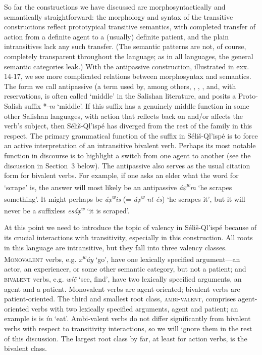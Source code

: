 \documentclass[output=paper,colorlinks,citecolor=brown]{langscibook}
\begin{document}
So far the constructions we have discussed are morphosyntactically and
semantically straightforward: the morphology and syntax of the
transitive constructions reflect prototypical transitive semantics,
with completed transfer of action from a definite agent to a (usually)
definite patient, and the plain intransitives lack any such transfer.
(The semantic patterns are not, of course, completely transparent
throughout the language; as in all languages, the general semantic
categories leak.)  With the antipassive construction, illustrated in
exx. 14-17, we see more complicated relations between morphosyntax and
semantics.  The form we call antipassive (a term used by, among
others, \cite[31]{Kroeber:1999}, \cite{Darnell:1990}, \cite{Gerdts:1993}, and,
with reservations, \cite[102]{Thompson&Thompson:1992} is often
called `middle' in the Salishan literature, and \cite[158]{Newman:1980}
posits a Proto-Salish suffix *-\emph{m} `middle'.  If this suffix has a
genuinely middle function in some other Salishan languages, with
action that reflects back on and/or affects the verb's subject, then
S\'eli\v{s}-Ql'isp\'e has diverged from the rest of the family in this
respect.  The primary grammatical function of the suffix in
S\'eli\v{s}-Ql'isp\'e is to force an active interpretation of an
intransitive bivalent verb.  Perhaps its most notable function in
discourse is to highlight a switch from one agent to another (see the
discussion in Section~3 below).  The antipassive also serves as the usual
citation form for bivalent verbs.  For example, if one asks an elder
what the word for `scrape' is, the answer will most likely be an
antipassive \emph{\textglotstop\'a{\d{x}\textsuperscript w}m} `he
scrapes something'.  It might perhaps be \emph{\textglotstop\'a{\d{x}\textsuperscript w}is} (= \emph{\textglotstop\'a{\d{x}\textsuperscript w}-nt-\'es}) `he scrapes it',
but it will never be a suffixless \emph{es\textglotstop\'a\d{x}\textsuperscript w} `it is scraped'.

At this point we need to introduce the topic of valency in
S\'eli\v{s}-Ql'isp\'e because of its crucial interactions with
transitivity, especially in this construction.  All roots in this
language are intransitive, but they fall into three valency
classes. \textsc{Monovalent} verbs, e.g. \emph{x\textsuperscript w\'uy}
`go', have one lexically specified argument---an actor, an
experiencer, or some other semantic category, but not a patient; and
\textsc{bivalent} verbs, e.g. \emph{w\'i\v{c}} `see, find', have two
lexically specified arguments, an agent and a patient.  Monovalent
verbs are agent-oriented; bivalent verbs are patient-oriented.  The
third and smallest root class, \textsc{ambi-valent}, comprises\newline
agent-oriented verbs with two lexically specified arguments, agent and
patient; an example is is \emph{\textglotstop\'i{\textltilde}n} `eat'.
Ambi-valent verbs do not differ significantly from bivalent verbs with
respect to transitivity interactions, so we will ignore them in the
rest of this discussion.  The largest root class by far, at least for
action verbs, is the bivalent class.
\end{document}

